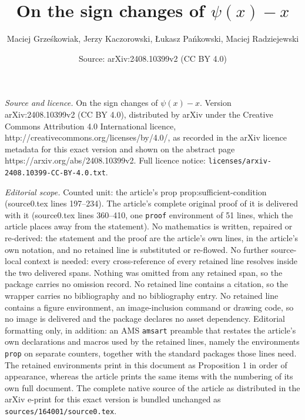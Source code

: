 \documentclass[10pt,a4paper]{amsart}
\title{On the sign changes of $\psi(x)-x$}
\author{Maciej Grze\'skowiak, Jerzy Kaczorowski, {\L}ukasz Pa\'nkowski, Maciej Radziejewski}
\date{Source: arXiv:2408.10399v2 (CC BY 4.0)}
\begin{document}
\maketitle

\noindent\emph{Source and licence.} On the sign changes of $\psi(x)-x$. Version arXiv:2408.10399v2 (CC BY 4.0), distributed by arXiv under the Creative Commons Attribution 4.0 International licence, http://creativecommons.org/licenses/by/4.0/, as recorded in the arXiv licence metadata for this exact version and shown on the abstract page https://arxiv.org/abs/2408.10399v2. Full licence notice: \texttt{licenses/arxiv-2408.10399-CC-BY-4.0.txt}.\par\smallskip

\noindent\textit{Editorial scope.} Counted unit: the article's prop prop:sufficient-condition (source0.tex lines 197--234). The article's complete original proof of it is delivered with it (source0.tex lines 360--410, one \texttt{proof} environment of 51 lines, which the article places away from the statement). No mathematics is written, repaired or re-derived: the statement and the proof are the article's own lines, in the article's own notation, and no retained line is substituted or re-flowed.  No further source-local context is needed: every cross-reference of every retained line resolves inside the two delivered spans.  Nothing was omitted from any retained span, so the package carries no omission record.  No retained line contains a citation, so the wrapper carries no bibliography and no bibliography entry.  No retained line contains a figure environment, an image-inclusion command or drawing code, so no image is delivered and the package declares no asset dependency.  Editorial formatting only, in addition: an AMS \texttt{amsart} preamble that restates the article's own declarations and macros used by the retained lines, namely the environments \texttt{prop} on separate counters, together with the standard packages those lines need.  The retained environments print in this document as Proposition 1 in order of appearance, whereas the article prints the same items with the numbering of its own full document.  The complete native source of the article as distributed in the arXiv e-print for this exact version is bundled unchanged as \texttt{sources/164001/source0.tex}.
\end{document}
